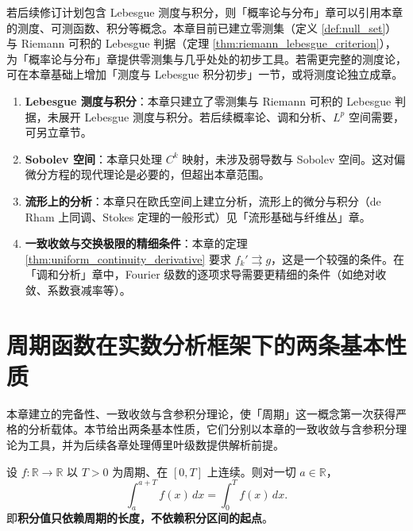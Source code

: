 \begin{remark}\label{rem:ra_to_probability}
若后续修订计划包含 Lebesgue 测度与积分，则「概率论与分布」章可以引用本章的测度、可测函数、积分等概念。本章目前已建立零测集（定义 \ref{def:null_set}）与 Riemann 可积的 Lebesgue 判据（定理 \ref{thm:riemann_lebesgue_criterion}），为「概率论与分布」章提供零测集与几乎处处的初步工具。若需更完整的测度论，可在本章基础上增加「测度与 Lebesgue 积分初步」一节，或将测度论独立成章。
\end{remark}

\begin{remark}[本章开放问题]\label{rem:ra_open}
\begin{enumerate}[label=(\roman*)]
    \item \textbf{Lebesgue 测度与积分}：本章只建立了零测集与 Riemann 可积的 Lebesgue 判据，未展开 Lebesgue 测度与积分。若后续概率论、调和分析、$L^p$ 空间需要，可另立章节。
    \item \textbf{Sobolev 空间}：本章只处理 $C^k$ 映射，未涉及弱导数与 Sobolev 空间。这对偏微分方程的现代理论是必要的，但超出本章范围。
    \item \textbf{流形上的分析}：本章只在欧氏空间上建立分析，流形上的微分与积分（de Rham 上同调、Stokes 定理的一般形式）见「流形基础与纤维丛」章。
    \item \textbf{一致收敛与交换极限的精细条件}：本章的定理 \ref{thm:uniform_continuity_derivative} 要求 $f_k' \rightrightarrows g$，这是一个较强的条件。在「调和分析」章中，Fourier 级数的逐项求导需要更精细的条件（如绝对收敛、系数衰减率等）。
\end{enumerate}
\end{remark}

\section{周期函数在实数分析框架下的两条基本性质}
\label{sec:periodic_functions_in_real_analysis}

本章建立的完备性、一致收敛与含参积分理论，使「周期」这一概念第一次获得严格的分析载体。本节给出两条基本性质，它们分别以本章的一致收敛与含参积分理论为工具，并为后续各章处理傅里叶级数提供解析前提。

\begin{proposition}[周期函数的积分与起点无关]\label{prop:period_integral_shift_invariant}
设 $f:\mathbb R\to\mathbb R$ 以 $T>0$ 为周期、在 $[0,T]$ 上连续。则对一切 $a\in\mathbb R$，
\[
\int_a^{a+T}f(x)\,dx=\int_0^{T}f(x)\,dx .
\]
即\textbf{积分值只依赖周期的长度，不依赖积分区间的起点}。
\end{proposition}

